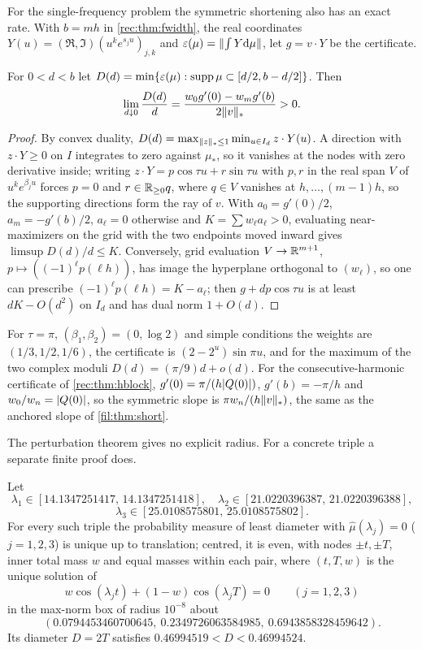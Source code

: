 For the single-frequency problem the symmetric shortening also has an exact rate. With $b=mh$ in
\cref{rec:thm:fwidth}, the real coordinates $Y(u)=(\Re,\Im)(u^ke^{s_ju})_{j,k}$ and
$\varepsilon(\mu)=\lVert\int Y\mathrm{d}\mu\rVert$, let $g=v\cdot Y$ be the certificate.

\begin{theorem}\label{rec:thm:fleak}
For $0<d<b$ let $D(d)=\min\{\varepsilon(\mu):\operatorname{supp}\mu\subset[d/2,b-d/2]\}$. Then
\[
 \lim_{d\downarrow0}\frac{D(d)}d=\frac{w_0g'(0)-w_mg'(b)}{2\lVert v\rVert_*}>0 .
\]
\end{theorem}

\begin{proof}
By convex duality, $D(d)=\max_{\lVert z\rVert_*\le1}\min_{u\in I_d}z\cdot Y(u)$. A direction with $z\cdot Y\ge0$
on $I$ integrates to zero against $\mu_*$, so it vanishes at the nodes with zero derivative inside;
writing $z\cdot Y=p\cos\tau u+r\sin\tau u$ with $p,r$ in the real span $V$ of $u^ke^{\beta_ju}$ forces
$p=0$ and $r\in\mathbb{R}_{\ge0}q$, where $q\in V$ vanishes at $h,\dots,(m-1)h$, so the supporting directions form
the ray of $v$. With $a_0=g'(0)/2$, $a_m=-g'(b)/2$, $a_\ell=0$ otherwise and $K=\sum w_\ell a_\ell>0$,
evaluating near-maximizers on the grid with the two endpoints moved inward gives $\limsup D(d)/d\le K$.
Conversely, grid evaluation $V\to\mathbb{R}^{m+1}$, $p\mapsto((-1)^\ell p(\ell h))$, has image the hyperplane
orthogonal to $(w_\ell)$, so one can prescribe $(-1)^\ell p(\ell h)=K-a_\ell$; then $g+dp\cos\tau u$ is at
least $dK-O(d^2)$ on $I_d$ and has dual norm $1+O(d)$.
\end{proof}

For $\tau=\pi$, $(\beta_1,\beta_2)=(0,\log2)$ and simple conditions the weights are $(1/3,1/2,1/6)$, the
certificate is $(2-2^u)\sin\pi u$, and for the maximum of the two complex moduli $D(d)=(\pi/9)d+o(d)$.
For the consecutive-harmonic certificate of \cref{rec:thm:hblock}, $g'(0)=\pi/(h\lvert Q(0)\rvert)$,
$g'(b)=-\pi/h$ and $w_0/w_n=\lvert Q(0)\rvert$, so the symmetric slope is $\pi w_n/(h\lVert v\rVert_*)$, the same as the
anchored slope of \cref{fil:thm:short}.

The perturbation theorem gives no explicit radius. For a concrete triple a separate finite proof does.

\begin{theorem}\label{fil:thm:three}
Let
\[
 \lambda_1\in[14.1347251417,\,14.1347251418],\quad\lambda_2\in[21.0220396387,\,21.0220396388],\]
\[\lambda_3\in[25.0108575801,\,25.0108575802].
\]
For every such triple the probability measure of least
diameter with $\widehat\mu(\lambda_j)=0$ ($j=1,2,3$) is unique up to translation; centred, it is even,
with nodes $\pm t,\pm T$, inner total mass $w$ and equal masses within each pair, where $(t,T,w)$ is the
unique solution of
\[
 w\cos(\lambda_jt)+(1-w)\cos(\lambda_jT)=0\qquad(j=1,2,3)
\]
in the max-norm box of radius $10^{-8}$ about
\[
 (0.0794453460700645,\ 0.2349726063584985,\ 0.6943858328459642).
\]
Its diameter $D=2T$ satisfies $0.46994519<D<0.46994524$.
\end{theorem}

